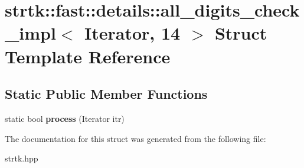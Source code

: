 \hypertarget{structstrtk_1_1fast_1_1details_1_1all__digits__check__impl_3_01Iterator_00_0114_01_4}{\section{strtk\-:\-:fast\-:\-:details\-:\-:all\-\_\-digits\-\_\-check\-\_\-impl$<$ Iterator, 14 $>$ Struct Template Reference}
\label{structstrtk_1_1fast_1_1details_1_1all__digits__check__impl_3_01Iterator_00_0114_01_4}
}
\subsection*{Static Public Member Functions}
\begin{DoxyCompactItemize}
\item 
\hypertarget{structstrtk_1_1fast_1_1details_1_1all__digits__check__impl_3_01Iterator_00_0114_01_4_a5d2322d765cc9d636e6f34ef66610e18}{static bool {\bfseries process} (Iterator itr)}\label{structstrtk_1_1fast_1_1details_1_1all__digits__check__impl_3_01Iterator_00_0114_01_4_a5d2322d765cc9d636e6f34ef66610e18}

\end{DoxyCompactItemize}


The documentation for this struct was generated from the following file\-:\begin{DoxyCompactItemize}
\item 
strtk.\-hpp\end{DoxyCompactItemize}
